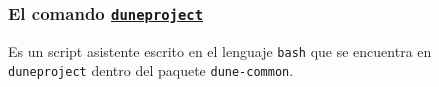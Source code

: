 \begin{frame}
	\frametitle{
		El comando \href{https://gitlab.dune-project.org/core/dune-common/-/raw/master/bin/duneproject}{\lstinline{duneproject}}
	}

	Es un script asistente escrito en el lenguaje \lstinline{bash}
	que se encuentra en \lstinline{duneproject}
	dentro del paquete \lstinline{dune-common}.
\end{frame}



